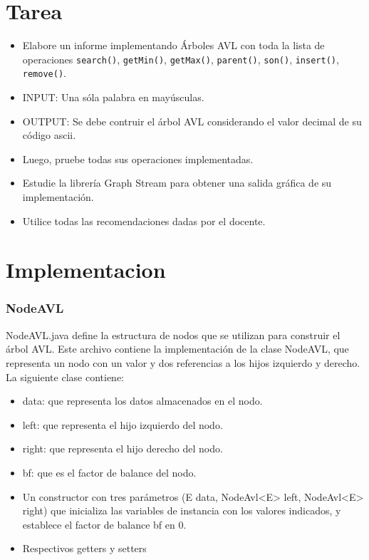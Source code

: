 \section{Tarea}
\begin{itemize}
    \item Elabore un informe implementando Árboles AVL con toda la lista de operaciones \verb|search()|, \verb|getMin()|, \verb|getMax()|, \verb|parent()|, \verb|son()|, \verb|insert()|, \verb|remove()|.
    \item INPUT: Una sóla palabra en mayúsculas.
    \item OUTPUT: Se debe contruir el árbol AVL considerando el valor decimal de su código ascii.
    \item Luego, pruebe todas sus operaciones implementadas.
    \item Estudie la librería Graph Stream para obtener una salida gráfica de su implementación.
    \item Utilice todas las recomendaciones dadas por el docente.
\end{itemize}
\section{Implementacion}
\subsubsection*{NodeAVL}
NodeAVL.java define la estructura de nodos que se utilizan para construir el árbol AVL. Este archivo contiene la implementación de la clase NodeAVL, que representa un nodo con un valor y dos referencias a los hijos izquierdo y derecho.\\

La siguiente clase contiene:
\begin{itemize}
    \item data: que representa los datos almacenados en el nodo.
    \item left: que representa el hijo izquierdo del nodo.
    \item right: que representa el hijo derecho del nodo.
    \item bf: que es el factor de balance del nodo.
    \item Un constructor con tres parámetros (E data, NodeAvl<E> left, NodeAvl<E> right) que inicializa las variables de instancia con los valores indicados, y establece el factor de balance bf en 0.
    \item Respectivos getters y setters
\end{itemize}

